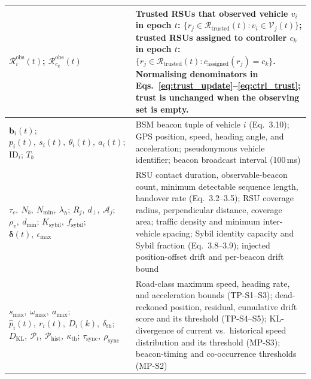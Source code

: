 \documentclass[12pt, a4paper]{report}
\begin{document}
\begin{longtable}{|m{3.6cm}|m{9.0cm}|}
$\mathcal{R}^{\mathrm{obs}}_i(t)$;\;
$\mathcal{R}^{\mathrm{obs}}_{c_k}(t)$ &
Trusted RSUs that observed vehicle $v_i$ in epoch $t$:
$\{r_j \in \mathcal{R}_{\mathrm{trusted}}(t)
 : v_i \in \mathcal{V}_j(t)\}$;
trusted RSUs assigned to controller $c_k$ in epoch $t$:
$\{r_j \in \mathcal{R}_{\mathrm{trusted}}(t)
 : c_{\mathrm{assigned}}(r_j) = c_k\}$.
Normalising denominators in
Eqs.~\eqref{eq:trust_update}--\eqref{eq:ctrl_trust};
trust is unchanged when the observing set is empty. \\
\hline
	$\mathbf{b}_i(t)$; $p_i(t),\ s_i(t),\ \theta_i(t),\ a_i(t)$; $\text{ID}_i$; $T_b$ & BSM beacon tuple of vehicle $i$ (Eq.~3.10); GPS position, speed, heading angle, and acceleration; pseudonymous vehicle identifier; beacon broadcast interval (100\,ms) \\
\hline
	$\tau_c,\ N_b,\ N_{\min},\ \lambda_h$; $R_j,\ d_\perp,\ \mathcal{A}_j$; $\rho_v,\ d_{\min}$; $K_{\text{sybil}},\ f_{\text{sybil}}$; $\boldsymbol{\delta}(t),\ \epsilon_{\max}$ & RSU contact duration, observable-beacon count, minimum detectable sequence length, handover rate (Eq.~3.2--3.5); RSU coverage radius, perpendicular distance, coverage area; traffic density and minimum inter-vehicle spacing; Sybil identity capacity and Sybil fraction (Eq.~3.8--3.9); injected position-offset drift and per-beacon drift bound \\
\hline
	$s_{\max},\ \omega_{\max},\ a_{\max}$; $\hat{p}_i(t),\ r_i(t),\ D_i(k),\ \delta_{\text{th}}$; $D_{\text{KL}},\ \mathcal{P}_t,\ \mathcal{P}_{\text{hist}},\ \kappa_{\text{th}}$; $\tau_{\text{sync}},\ \rho_{\text{sync}}$ & Road-class maximum speed, heading rate, and acceleration bounds (TP-S1--S3); dead-reckoned position, residual, cumulative drift score and its threshold (TP-S4--S5); KL-divergence of current vs.\ historical speed distribution and its threshold (MP-S3); beacon-timing and co-occurrence thresholds (MP-S2) \\


\end{longtable}
\end{document}
